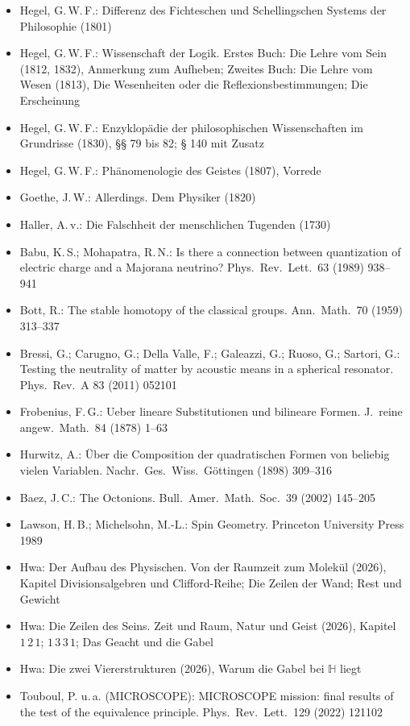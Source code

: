 \documentclass[11pt,a4paper]{article}
\newcommand{\HH}{\mathbb H}
\begin{document}
\begin{itemize}[leftmargin=1.2em,itemsep=0pt]
\item Hegel, G.\,W.\,F.: Differenz des Fichteschen und Schellingschen Systems der Philosophie (1801)
\item Hegel, G.\,W.\,F.: Wissenschaft der Logik. Erstes Buch: Die Lehre vom Sein (1812, 1832), Anmerkung zum Aufheben; Zweites Buch: Die Lehre vom Wesen (1813), Die Wesenheiten oder die Reflexionsbestimmungen; Die Erscheinung
\item Hegel, G.\,W.\,F.: Enzyklopädie der philosophischen Wissenschaften im Grundrisse (1830), §§ 79 bis 82; § 140 mit Zusatz
\item Hegel, G.\,W.\,F.: Phänomenologie des Geistes (1807), Vorrede
\item Goethe, J.\,W.: Allerdings. Dem Physiker (1820)
\item Haller, A.\,v.: Die Falschheit der menschlichen Tugenden (1730)
\item Babu, K.\,S.; Mohapatra, R.\,N.: Is there a connection between quantization of electric charge and a Majorana neutrino? Phys.\ Rev.\ Lett.\ 63 (1989) 938--941
\item Bott, R.: The stable homotopy of the classical groups. Ann.\ Math.\ 70 (1959) 313--337
\item Bressi, G.; Carugno, G.; Della Valle, F.; Galeazzi, G.; Ruoso, G.; Sartori, G.: Testing the neutrality of matter by acoustic means in a spherical resonator. Phys.\ Rev.\ A 83 (2011) 052101
\item Frobenius, F.\,G.: Ueber lineare Substitutionen und bilineare Formen. J.\ reine angew.\ Math.\ 84 (1878) 1--63
\item Hurwitz, A.: Über die Composition der quadratischen Formen von beliebig vielen Variablen. Nachr.\ Ges.\ Wiss.\ Göttingen (1898) 309--316
\item Baez, J.\,C.: The Octonions. Bull.\ Amer.\ Math.\ Soc.\ 39 (2002) 145--205
\item Lawson, H.\,B.; Michelsohn, M.-L.: Spin Geometry. Princeton University Press 1989
\item Hwa: Der Aufbau des Physischen. Von der Raumzeit zum Molekül (2026), Kapitel Divisionsalgebren und Clifford-Reihe; Die Zeilen der Wand; Rest und Gewicht
\item Hwa: Die Zeilen des Seins. Zeit und Raum, Natur und Geist (2026), Kapitel $1\,2\,1$; $1\,3\,3\,1$; Das Geacht und die Gabel
\item Hwa: Die zwei Viererstrukturen (2026), Warum die Gabel bei $\HH$ liegt
\item Touboul, P. u.\,a. (MICROSCOPE): MICROSCOPE mission: final results of the test of the equivalence principle. Phys.\ Rev.\ Lett.\ 129 (2022) 121102
\end{itemize}
\end{document}
